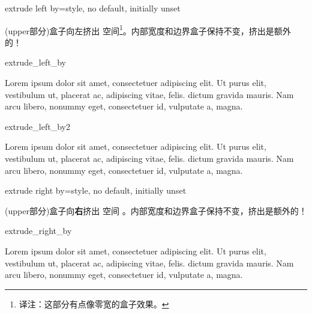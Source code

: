 \begin{docTcbKey}[][doc updated=2014-09-19]{extrude left by}{=}{style, no default, initially unset}

  (upper部分)盒子向左挤出  空间\footnote{译注：这部分有点像零宽的盒子效果。}。内部宽度和边界盒子保持不变，挤出是额外的！
\begin{exdispExample}{extrude_left_by}

Lorem ipsum dolor sit amet, consectetuer adipiscing elit. Ut purus elit,
vestibulum ut, placerat ac, adipiscing vitae, felis.
 dictum gravida mauris.
Nam arcu libero, nonummy eget, consectetuer id, vulputate a, magna.
\end{exdispExample}

\begin{exdispExample}{extrude_left_by2}
  
  Lorem ipsum dolor sit amet, consectetuer adipiscing elit. Ut purus elit,
  vestibulum ut, placerat ac, adipiscing vitae, felis.
   dictum gravida mauris.
  Nam arcu libero, nonummy eget, consectetuer id, vulputate a, magna.
  \end{exdispExample}

\end{docTcbKey}

\begin{docTcbKey}[][doc updated=2014-09-19]{extrude right by}{=}{style, no default, initially unset}

  (upper部分)盒子向{\bf 右}挤出  空间%
  。内部宽度和边界盒子保持不变，挤出是额外的！
\begin{exdispExample}{extrude_right_by}

Lorem ipsum dolor sit amet, consectetuer adipiscing elit. Ut purus elit,
vestibulum ut, placerat ac, adipiscing vitae, felis.
 dictum gravida mauris.
Nam arcu libero, nonummy eget, consectetuer id, vulputate a, magna.
\end{exdispExample}
\end{docTcbKey}

